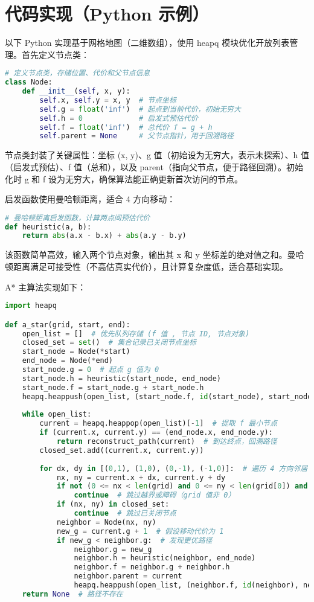 \chapter{代码实现（Python 示例）}
以下 Python 实现基于网格地图（二维数组），使用 heapq 模块优化开放列表管理。首先定义节点类：\par
\begin{lstlisting}[language=python]
# 定义节点类，存储位置、代价和父节点信息
class Node:
    def __init__(self, x, y):
        self.x, self.y = x, y  # 节点坐标
        self.g = float('inf')  # 起点到当前代价，初始无穷大
        self.h = 0             # 启发式预估代价
        self.f = float('inf')  # 总代价 f = g + h
        self.parent = None     # 父节点指针，用于回溯路径
\end{lstlisting}
节点类封装了关键属性：坐标 (x, y)、g 值（初始设为无穷大，表示未探索）、h 值（启发式预估）、f 值（总和），以及 parent（指向父节点，便于路径回溯）。初始化时 g 和 f 设为无穷大，确保算法能正确更新首次访问的节点。\par
启发函数使用曼哈顿距离，适合 4 方向移动：\par
\begin{lstlisting}[language=python]
# 曼哈顿距离启发函数，计算两点间预估代价
def heuristic(a, b):
    return abs(a.x - b.x) + abs(a.y - b.y)
\end{lstlisting}
该函数简单高效，输入两个节点对象，输出其 x 和 y 坐标差的绝对值之和。曼哈顿距离满足可接受性（不高估真实代价），且计算复杂度低，适合基础实现。\par
A* 主算法实现如下：\par
\begin{lstlisting}[language=python]
import heapq

def a_star(grid, start, end):
    open_list = []  # 优先队列存储 (f 值 , 节点 ID, 节点对象)
    closed_set = set()  # 集合记录已关闭节点坐标
    start_node = Node(*start)
    end_node = Node(*end)
    start_node.g = 0  # 起点 g 值为 0
    start_node.h = heuristic(start_node, end_node)
    start_node.f = start_node.g + start_node.h
    heapq.heappush(open_list, (start_node.f, id(start_node), start_node))
    
    while open_list:
        current = heapq.heappop(open_list)[-1]  # 提取 f 最小节点
        if (current.x, current.y) == (end_node.x, end_node.y):
            return reconstruct_path(current)  # 到达终点，回溯路径
        closed_set.add((current.x, current.y))
        
        for dx, dy in [(0,1), (1,0), (0,-1), (-1,0)]:  # 遍历 4 方向邻居
            nx, ny = current.x + dx, current.y + dy
            if not (0 <= nx < len(grid) and 0 <= ny < len(grid[0]) and grid[nx][ny] == 0):
                continue  # 跳过越界或障碍（grid 值非 0）
            if (nx, ny) in closed_set:
                continue  # 跳过已关闭节点
            neighbor = Node(nx, ny)
            new_g = current.g + 1  # 假设移动代价为 1
            if new_g < neighbor.g:  # 发现更优路径
                neighbor.g = new_g
                neighbor.h = heuristic(neighbor, end_node)
                neighbor.f = neighbor.g + neighbor.h
                neighbor.parent = current
                heapq.heappush(open_list, (neighbor.f, id(neighbor), neighbor))
    return None  # 路径不存在
\end{lstlisting}
